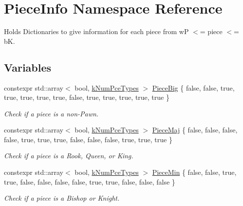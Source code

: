 \hypertarget{namespacePieceInfo}{}\section{Piece\+Info Namespace Reference}
\label{namespacePieceInfo}


Holds Dictionaries to give information for each piece from wP $<$= piece $<$= bK.  


\subsection*{Variables}
\begin{DoxyCompactItemize}
\item 
\mbox{\label{namespacePieceInfo_ab092fc01811699d480edb92ab9864f71}} 
constexpr std\+::array$<$ bool, \mbox{\hyperlink{constants_8h_a65fd654c96b3bb6b2e3f2e5c2d5bb09c}{k\+Num\+Pce\+Types}} $>$ \mbox{\hyperlink{namespacePieceInfo_ab092fc01811699d480edb92ab9864f71}{Piece\+Big}} \{ false, false, true, true, true, true, true, false, true, true, true, true, true \}
\begin{DoxyCompactList}\small\item\em Check if a piece is a non-\/\+Pawn. \end{DoxyCompactList}\item 
\mbox{\label{namespacePieceInfo_a1a1d6bd927fc1d3ade0c94cfbe345c86}} 
constexpr std\+::array$<$ bool, \mbox{\hyperlink{constants_8h_a65fd654c96b3bb6b2e3f2e5c2d5bb09c}{k\+Num\+Pce\+Types}} $>$ \mbox{\hyperlink{namespacePieceInfo_a1a1d6bd927fc1d3ade0c94cfbe345c86}{Piece\+Maj}} \{ false, false, false, false, true, true, true, false, false, false, true, true, true \}
\begin{DoxyCompactList}\small\item\em Check if a piece is a Rook, Queen, or King. \end{DoxyCompactList}\item 
\mbox{\label{namespacePieceInfo_a1681e87a2e9b102711a18183ff2e877d}} 
constexpr std\+::array$<$ bool, \mbox{\hyperlink{constants_8h_a65fd654c96b3bb6b2e3f2e5c2d5bb09c}{k\+Num\+Pce\+Types}} $>$ \mbox{\hyperlink{namespacePieceInfo_a1681e87a2e9b102711a18183ff2e877d}{Piece\+Min}} \{ false, false, true, true, false, false, false, false, true, true, false, false, false \}
\begin{DoxyCompactList}\small\item\em Check if a piece is a Bishop or Knight. \end{DoxyCompactList}\item 

\end{DoxyCompactItemize}
